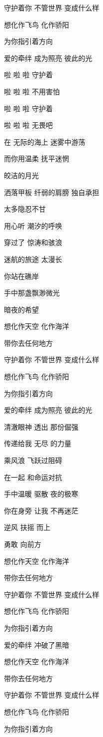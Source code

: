 \documentclass[]{ctexbook}
\begin{document}
守护着你 不管世界 变成什么样

想化作飞鸟 化作骄阳

为你指引着方向

爱的牵绊 成为照亮 彼此的光

啦 啦 啦 守护着

啦 啦 啦 不用害怕

啦 啦 啦 守护着

啦 啦 啦 无畏吧

在 无际的海上 迷雾中游荡

而你用温柔 抚平迷惘

皎洁的月光

洒落甲板 纤弱的肩膀 独自承担

太多隐忍不甘

用心听 潮汐的呼唤

穿过了 惊涛和骇浪

迷航的旅途 太漫长

你站在礁岸

手中那盏飘渺微光

暗夜的希望

想化作天空 化作海洋

带你去任何地方

守护着你 不管世界 变成什么样

想化作飞鸟 化作骄阳

为你指引着方向

爱的牵绊 成为照亮 彼此的光

清澈眼神 透出 那份倔强

传递给我 无尽 的力量

乘风浪 飞跃过阻碍

在一起 和命运对抗

手中温暖 驱散 夜的极寒

你在身旁 让我 不再迷茫

逆风 扶摇 而上

勇敢 向前方

想化作天空 化作海洋

带你去任何地方

守护着你 不管世界 变成什么样

想化作飞鸟 化作骄阳

为你指引着方向

爱的牵绊 冲破了黑暗

想化作天空 化作海洋

带你去任何地方

守护着你 不管世界 变成什么样

想化作飞鸟 化作骄阳

为你指引着方向
\end{document}
